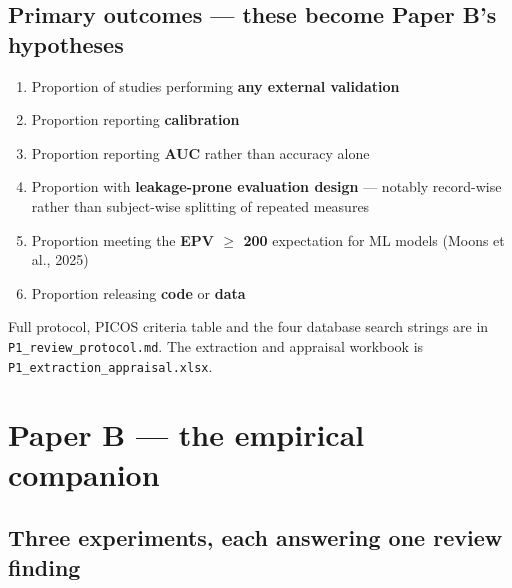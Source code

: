 \documentclass[11pt,a4paper]{article}
\begin{document}
\subsection{Primary outcomes --- these become Paper B's hypotheses}

\begin{enumerate}
  \item Proportion of studies performing \textbf{any external validation}
  \item Proportion reporting \textbf{calibration}
  \item Proportion reporting \textbf{AUC} rather than accuracy alone
  \item Proportion with \textbf{leakage-prone evaluation design} --- notably
        record-wise rather than subject-wise splitting of repeated measures
  \item Proportion meeting the \textbf{EPV $\geq$ 200} expectation for ML
        models (Moons et al., 2025)
  \item Proportion releasing \textbf{code} or \textbf{data}
\end{enumerate}

Full protocol, PICOS criteria table and the four database search strings are
in \texttt{P1\_review\_protocol.md}. The extraction and appraisal workbook is
\texttt{P1\_extraction\_appraisal.xlsx}.

\section{Paper B --- the empirical companion}

\subsection{Three experiments, each answering one review finding}
\end{document}
